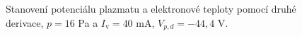 \documentclass[a4paper,12pt]{article}
\begin{document}
\newpage
\begin{figure}[h!]
	\centering
	\begin{subfigure}[b]{.49\textwidth}
		\centering
	\end{subfigure}
	\begin{subfigure}[b]{.49\textwidth}
		\centering
	\end{subfigure}
	\caption{Stanovení potenciálu plazmatu a elektronové teploty pomocí druhé 
	derivace, $p = 16$ 
	\si{\pascal} a $I_\text{v} = 40$ \si{\milli\ampere}, $V_{p,d} = 
	-44,4$ V.}
	\label{data6sec}
\end{figure}
\end{document}
